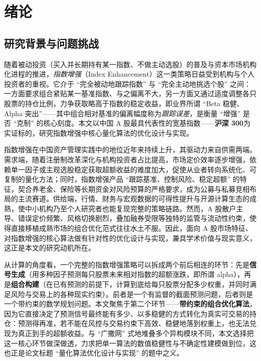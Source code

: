 
\chapter{绪论}

\section{研究背景与问题挑战}

随着被动投资（买入并长期持有某一指数、不做主动选股）的普及与资本市场机构化进程的推进，\emph{指数增强}（Index Enhancement）这一类策略日益受到机构与个人投资者的重视。它介于 ``完全被动地跟踪指数'' 与 ``完全主动地挑选个股'' 之间：一方面要求组合紧贴某一基准指数、与之偏离不大，另一方面又通过适度调整各只股票的持仓比例，力争获取略高于指数的稳定收益，即业界所谓 ``Beta 稳健、Alpha 突出''——其中组合相对基准的偏离幅度称为\emph{跟踪误差}，是衡量 ``增强'' 是否 ``克制'' 的核心刻度。本文以中国 A 股最具代表性的宽基指数——\textbf{沪深 300}为实证标的，研究指数增强中核心量化算法的优化设计与实现。

指数增强在中国资产管理实践中的地位近年来持续上升，其驱动力来自供需两端。需求端，随着注册制改革深化与机构投资者占比提高，市场定价效率逐步增强，依赖单一因子或主观选股稳定获取超额收益的难度加大，促使从业者转向系统化、可复制的量化方法；同时，指数增强产品 ``跟踪基准、控制风险、稳定超额'' 的特征，契合养老金、保险等长期资金对风险预算的严格要求，成为公募与私募竞相布局的主流赛道。供给端，行情、财务与宏观数据的可得性提升与开源计算生态的成熟，使中小机构乃至个人研究者也能复现完整的策略链路。然而，A 股散户主导、错误定价频繁、风格切换剧烈，叠加融券受限等独特的监管与流动性约束，使得直接移植成熟市场的组合优化范式往往水土不服。因此，面向 A 股市场特征、对指数增强的核心算法做有针对性的优化设计与实现，兼具学术价值与现实意义，这正是本文的研究动机所在。

从计算的角度看，一个完整的指数增强策略可以拆成两个前后相连的环节：先是\textbf{信号生成}（用多种因子预测每只股票未来相对指数的超额涨跌，即所谓 alpha），再是\textbf{组合构建}（在已有预测的前提下，计算到底给每只股票分配多少权重，并同时满足风险与交易上的各种现实约束）。前者是一个有监督的截面预测问题，后者则是一个带约束的数学规划问题。本文聚焦于第二个环节——\textbf{带约束的组合优化算法}，因为它直接决定了预测信号最终能有多少、以多稳健的方式转化为真实可交易的持仓：预测得再准，若不能在风控与交易约束下高效、稳健地落到权重上，也无法兑现为真正到手的超额收益。与 ``广撒网'' 式地堆叠多个异构模块不同，本文选择把这一核心环节做深做透，力求把单一算法的数值稳健性与不确定性建模做到位，这也正是论文标题 ``量化算法优化设计与实现'' 的题中之义。

